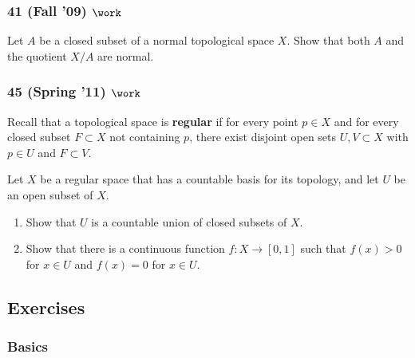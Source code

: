 \hypertarget{fall-09-work}{%
\subsubsection{\texorpdfstring{41 (Fall '09)
\(\work\)}{41 (Fall '09) \textbackslash work}}\label{fall-09-work}}

\begin{problem}[?]

Let \(A\) be a closed subset of a normal topological space \(X\). Show
that both \(A\) and the quotient \(X/A\) are normal.

\end{problem}

\hypertarget{spring-11-work-1}{%
\subsubsection{\texorpdfstring{45 (Spring '11)
\(\work\)}{45 (Spring '11) \textbackslash work}}\label{spring-11-work-1}}

\begin{problem}[?]

Recall that a topological space is \textbf{regular} if for every point
\(p \in X\) and for every closed subset \(F \subset X\) not containing
\(p\), there exist disjoint open sets \(U, V \subset X\) with
\(p \in U\) and \(F \subset V\).

Let \(X\) be a regular space that has a countable basis for its
topology, and let \(U\) be an open subset of \(X\).

\begin{enumerate}
\def\labelenumi{\alph{enumi}.}
\item
  Show that \(U\) is a countable union of closed subsets of \(X\).
\item
  Show that there is a continuous function \(f : X \to [0,1]\) such that
  \(f (x) > 0\) for \(x \in U\) and \(f (x) = 0\) for \(x \in U\).
\end{enumerate}

\end{problem}

\hypertarget{exercises}{%
\subsection{Exercises}\label{exercises}}

\hypertarget{basics}{%
\subsubsection{Basics}\label{basics}}

